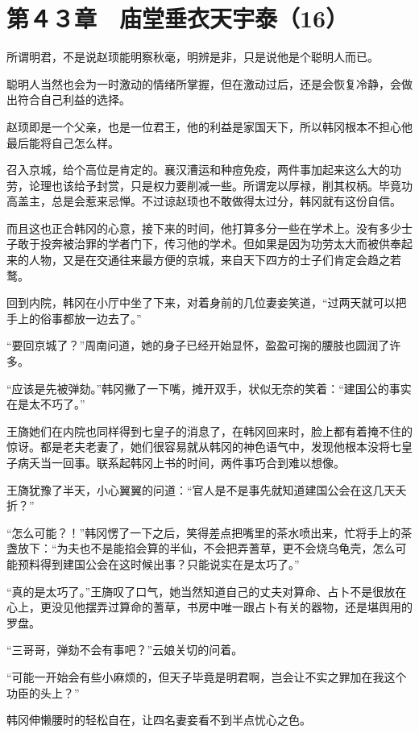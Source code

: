 \section{第４３章　庙堂垂衣天宇泰（16）}

所谓明君，不是说赵顼能明察秋毫，明辨是非，只是说他是个聪明人而已。

聪明人当然也会为一时激动的情绪所掌握，但在激动过后，还是会恢复冷静，会做出符合自己利益的选择。

赵顼即是一个父亲，也是一位君王，他的利益是家国天下，所以韩冈根本不担心他最后能将自己怎么样。

召入京城，给个高位是肯定的。襄汉漕运和种痘免疫，两件事加起来这么大的功劳，论理也该给予封赏，只是权力要削减一些。所谓宠以厚禄，削其权柄。毕竟功高盖主，总是会惹来忌惮。不过谅赵顼也不敢做得太过分，韩冈就有这份自信。

而且这也正合韩冈的心意，接下来的时间，他打算多分一些在学术上。没有多少士子敢于投奔被治罪的学者门下，传习他的学术。但如果是因为功劳太大而被供奉起来的人物，又是在交通往来最方便的京城，来自天下四方的士子们肯定会趋之若鹜。

回到内院，韩冈在小厅中坐了下来，对着身前的几位妻妾笑道，“过两天就可以把手上的俗事都放一边去了。”

“要回京城了？”周南问道，她的身子已经开始显怀，盈盈可掬的腰肢也圆润了许多。

“应该是先被弹劾。”韩冈撇了一下嘴，摊开双手，状似无奈的笑着：“建国公的事实在是太不巧了。”

王旖她们在内院也同样得到七皇子的消息了，在韩冈回来时，脸上都有着掩不住的惊讶。都是老夫老妻了，她们很容易就从韩冈的神色语气中，发现他根本没将七皇子病夭当一回事。联系起韩冈上书的时间，两件事巧合到难以想像。

王旖犹豫了半天，小心翼翼的问道：“官人是不是事先就知道建国公会在这几天夭折？”

“怎么可能？！”韩冈愣了一下之后，笑得差点把嘴里的茶水喷出来，忙将手上的茶盏放下：“为夫也不是能掐会算的半仙，不会把弄蓍草，更不会烧乌龟壳，怎么可能预料得到建国公会在这时候出事？只能说实在是太巧了。”

“真的是太巧了。”王旖叹了口气，她当然知道自己的丈夫对算命、占卜不是很放在心上，更没见他摆弄过算命的蓍草，书房中唯一跟占卜有关的器物，还是堪舆用的罗盘。

“三哥哥，弹劾不会有事吧？”云娘关切的问着。

“可能一开始会有些小麻烦的，但天子毕竟是明君啊，岂会让不实之罪加在我这个功臣的头上？”

韩冈伸懒腰时的轻松自在，让四名妻妾看不到半点忧心之色。

